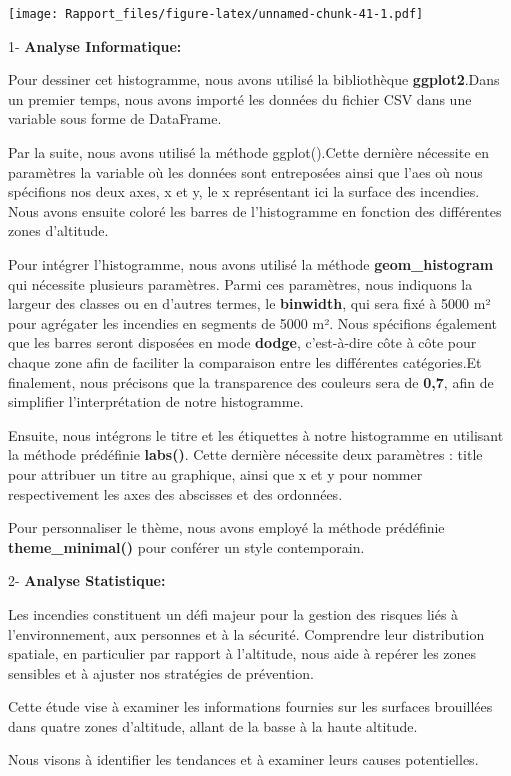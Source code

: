 \documentclass[
]{article}
\begin{document}
\texttt{[image: Rapport\_files/figure-latex/unnamed-chunk-41-1.pdf]}

1- \textbf{Analyse Informatique:}

Pour dessiner cet histogramme, nous avons utilisé la bibliothèque
\textbf{ggplot2}.Dans un premier temps, nous avons importé les données
du fichier CSV dans une variable sous forme de DataFrame.

Par la suite, nous avons utilisé la méthode ggplot().Cette dernière
nécessite en paramètres la variable où les données sont entreposées
ainsi que l'aes où nous spécifions nos deux axes, x et y, le x
représentant ici la surface des incendies. Nous avons ensuite coloré les
barres de l'histogramme en fonction des différentes zones d'altitude.

Pour intégrer l'histogramme, nous avons utilisé la méthode
\textbf{geom\_histogram} qui nécessite plusieurs paramètres. Parmi ces
paramètres, nous indiquons la largeur des classes ou en d'autres termes,
le \textbf{binwidth}, qui sera fixé à 5000 m² pour agrégater les
incendies en segments de 5000 m². Nous spécifions également que les
barres seront disposées en mode \textbf{dodge}, c'est-à-dire côte à côte
pour chaque zone afin de faciliter la comparaison entre les différentes
catégories.Et finalement, nous précisons que la transparence des
couleurs sera de \textbf{0,7}, afin de simplifier l'interprétation de
notre histogramme.

Ensuite, nous intégrons le titre et les étiquettes à notre histogramme
en utilisant la méthode prédéfinie \textbf{labs()}. Cette dernière
nécessite deux paramètres : title pour attribuer un titre au graphique,
ainsi que x et y pour nommer respectivement les axes des abscisses et
des ordonnées.

Pour personnaliser le thème, nous avons employé la méthode prédéfinie
\textbf{theme\_minimal()} pour conférer un style contemporain.

2- \textbf{Analyse Statistique:}

Les incendies constituent un défi majeur pour la gestion des risques
liés à l'environnement, aux personnes et à la sécurité. Comprendre leur
distribution spatiale, en particulier par rapport à l'altitude, nous
aide à repérer les zones sensibles et à ajuster nos stratégies de
prévention.

Cette étude vise à examiner les informations fournies sur les surfaces
brouillées dans quatre zones d'altitude, allant de la basse à la haute
altitude.

Nous visons à identifier les tendances et à examiner leurs causes
potentielles.
\end{document}
